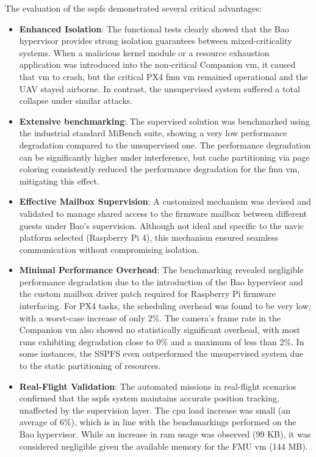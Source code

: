 The evaluation of the \gls{sspfs} demonstrated several critical
advantages:
\begin{itemize}
\item \textbf{Enhanced Isolation}: The functional tests clearly
  showed that the Bao hypervisor provides strong isolation guarantees between
  mixed-criticality systems. When a malicious kernel module or a resource
  exhaustion application was introduced into the non-critical Companion
  \gls{vm}, it caused that \gls{vm} to crash, but the critical PX4 \gls{fmu}
  \gls{vm} remained operational and the UAV stayed airborne. In contrast, the
  unsupervised system suffered a total collapse under similar attacks.
\item \textbf{Extensive benchmarking}: The supervised solution was benchmarked
  using the industrial standard MiBench suite, showing a very low performance
  degradation compared to the unsupervised one. The performance degradation can
  be significantly higher under interference, but cache partitioning via page
  coloring consistently reduced the performance degradation for the \gls{fmu}
  \gls{vm}, mitigating this effect.
\item
\textbf{Effective Mailbox Supervision}: A
  customized mechanism was devised and validated to manage shared access to the
  firmware mailbox between different guests under Bao's supervision. Although
  not ideal and specific to the \gls{uavic} platform selected (Raspberry Pi 4),
  this mechanism ensured seamless communication without compromising isolation.
\item \textbf{Minimal Performance Overhead}: The benchmarking revealed negligible
  performance degradation due to the introduction of the Bao hypervisor and the
  custom mailbox driver patch required for Raspberry Pi firmware
  interfacing. For PX4 tasks, the scheduling overhead was found to be very low,
  with a worst-case increase of only 2\%. The camera's frame rate in the
  Companion \gls{vm} also showed no statistically significant overhead, with
  most runs exhibiting degradation close to 0\% and a maximum of less than
  2\%. In some instances, the SSPFS even outperformed the unsupervised system
  due to the static partitioning of resources.
\item \textbf{Real-Flight Validation}: The automated missions in real-flight scenarios confirmed that the
  \gls{sspfs} system maintains accurate position tracking, unaffected by the
  supervision layer. The \gls{cpu} load increase was small (an average of 6\%),
  which is in line with the benchmarkings performed on the Bao hypervisor.
  While an increase in \gls{ram} usage was observed (99 KB), it was
  considered negligible given the available memory for the FMU \gls{vm} (144
  MB).
\end{itemize}

